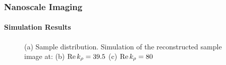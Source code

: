 \documentclass[mathserif,16pt,xcolor=table]{beamer}
\begin{document}
      \setcounter{subfigure}{0}%
      \begin{frame}[t]
        \frametitle{Nanoscale Imaging}
        \framesubtitle{Simulation Results}
        \begin{figure}[!htbp] \vspace*{-1cm} \centering \hspace*{-.25cm}
          \caption{(a) Sample distribution. Simulation of the reconstructed sample image at: (b) $\Re k_{\rho} = 39.5$ (c) $\Re k_{\rho} = 80$}
          \label{fig:simulation}
        \end{figure}
      \end{frame}
\end{document}
